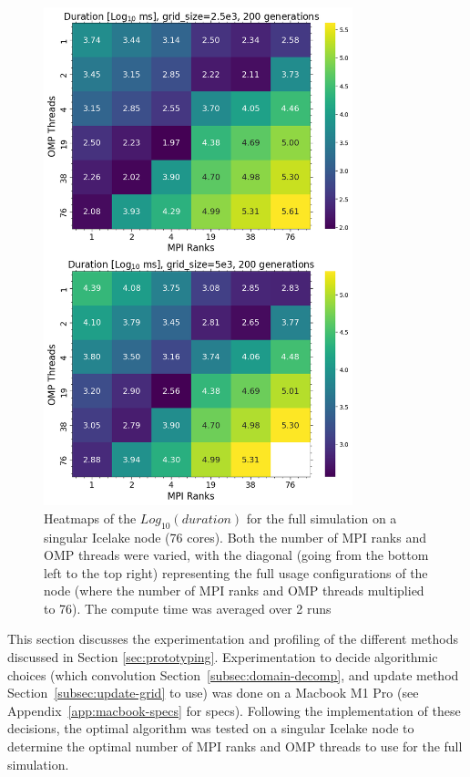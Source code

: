 \begin{figure}[t]
\centering
\includegraphics[width=0.8\textwidth]{./figures/mpi_vs_omp_hpc}
\caption{Heatmaps of the $Log_{10}(duration)$ for the full simulation on a singular Icelake node (76 cores).
    Both the number of MPI ranks and OMP threads were varied, with the diagonal (going from the bottom left to the top right)
    representing the full usage configurations of the node (where the number of MPI ranks and OMP threads multiplied to 76).
    The compute time was averaged over 2 runs}
\label{fig:mpi_vs_omp_hpc}
\end{figure}

This section discusses the experimentation and profiling of the different methods discussed in Section \eqref{sec:prototyping}.
Experimentation to decide algorithmic choices (which convolution Section~\eqref{subsec:domain-decomp}, and update method
Section~\eqref{subsec:update-grid} to use) was done on a Macbook M1 Pro (see Appendix~\eqref{app:macbook-specs} for specs).
Following the implementation of these decisions, the optimal algorithm was tested on a singular Icelake node to determine
the optimal number of MPI ranks and OMP threads to use for the full simulation.

